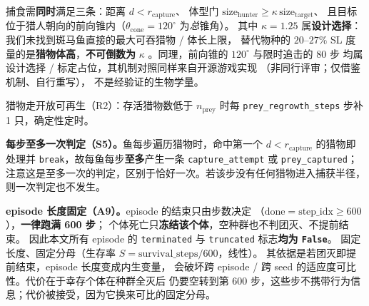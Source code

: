 捕食需\textbf{同时}满足三条：距离 $d<r_{\text{capture}}$、
体型门 $\text{size}_{\text{hunter}}\ge\kappa\,\text{size}_{\text{target}}$、
且目标位于猎人朝向的前向锥内（$\theta_{\text{cone}}=120^\circ$ 为\emph{总}锥角）。
其中 $\kappa=1.25$ 属\textbf{设计选择}：我们未找到斑马鱼直接的最大可吞猎物 / 体长上限，
替代物种的 $20$--$27\%$ SL 度量的是\textbf{猎物体高}，\textbf{不可倒数为} $\kappa$
\citep{bib221_mihalitsis2017}。同理，前向锥的 $120^\circ$ 与限时追击的 $80$ 步
均属设计选择 / 标定占位，其机制对照同样来自开源游戏实现
\citep{bib217_tghbrkn.d.,bib218_monkwarriorn.d.}（非同行评审；仅借鉴机制、自行重写），
不是经验证的生物学量。

猎物走开放可再生（R2）：存活猎物数低于 $n_{\text{prey}}$ 时每
\texttt{prey\_regrowth\_steps} 步补 1 只，确定性定时。

\textbf{每步至多一次判定（S5）。}鱼每步遍历猎物时，命中第一个 $d<r_{\text{capture}}$
的猎物即处理并 \texttt{break}，故每鱼每步\textbf{至多}产生一条
\texttt{capture\_attempt} 或 \texttt{prey\_captured}；
注意这是至多一次的判定，区别于恰好一次。若该步没有任何猎物进入捕获半径，
则一次判定也不发生。

\textbf{episode 长度固定（A9）。}episode 的结束只由步数决定
（$\text{done}=\text{step\_idx}\ge600$），\textbf{一律跑满 600 步}；
个体死亡只\textbf{冻结该个体}，空种群也不判团灭、不提前结束。
因此本文所有 episode 的 \texttt{terminated} 与 \texttt{truncated} 标志\textbf{均为 \texttt{False}}。
固定长度、固定分母（生存率 $S=\text{survival\_steps}/600$，线性）。
其依据是若团灭即提前结束，episode 长度变成内生变量，
会破坏跨 episode / 跨 seed 的适应度可比性。代价在于幸存个体在种群全灭后
仍要空转到第 600 步，这些步不携带行为信息；代价被接受，因为它换来可比的固定分母。

